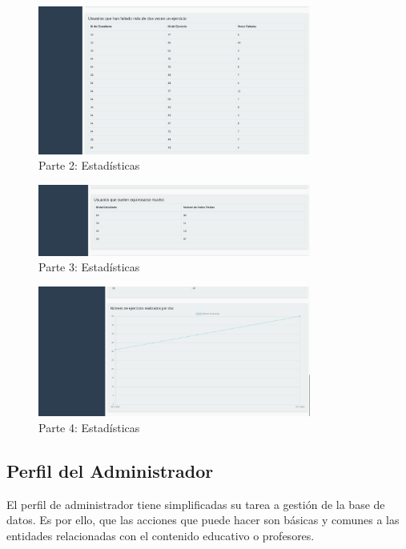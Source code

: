 \begin{appendices}
\begin{figure}[H]
    \centering
    \includegraphics[width=0.8\textwidth]{imagenes/Manual/estadistica3.png}
    \caption{Parte 2: Estadísticas}
\end{figure}

\begin{figure}[H]
    \centering
    \includegraphics[width=0.8\textwidth]{imagenes/Manual/estadistica2.png}
    \caption{Parte 3: Estadísticas}
\end{figure}

\begin{figure}[H]
    \centering
    \includegraphics[width=0.8\textwidth]{imagenes/Manual/estadistica1.png}
    \caption{Parte 4: Estadísticas}
\end{figure}

\subsection {Perfil del Administrador}

El perfil de administrador tiene simplificadas su tarea a gestión de la base de datos. Es por ello, que las acciones que puede hacer son básicas y comunes a las entidades relacionadas con el contenido educativo o profesores.


\end{appendices}
